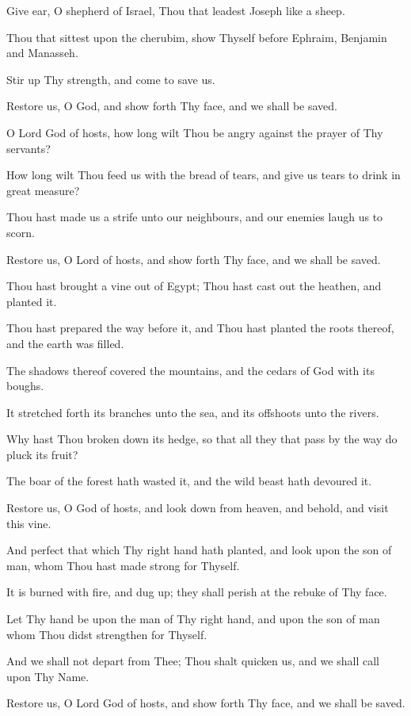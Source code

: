 Give ear, O shepherd of Israel, Thou that leadest Joseph like a sheep.

Thou that sittest upon the cherubim, show Thyself before Ephraim, Benjamin and Manasseh.

Stir up Thy strength, and come to save us.

Restore us, O God, and show forth Thy face, and we shall be saved.

O Lord God of hosts, how long wilt Thou be angry against the prayer of Thy servants?

How long wilt Thou feed us with the bread of tears, and give us tears to drink in great measure?

Thou hast made us a strife unto our neighbours, and our enemies laugh us to scorn.

Restore us, O Lord of hosts, and show forth Thy face, and we shall be saved.

Thou hast brought a vine out of Egypt; Thou hast cast out the heathen, and planted it.

Thou hast prepared the way before it, and Thou hast planted the roots thereof, and the earth was filled.

The shadows thereof covered the mountains, and the cedars of God with its boughs.

It stretched forth its branches unto the sea, and its offshoots unto the rivers.

Why hast Thou broken down its hedge, so that all they that pass by the way do pluck its fruit?

The boar of the forest hath wasted it, and the wild beast hath devoured it.

Restore us, O God of hosts, and look down from heaven, and behold, and visit this vine.

And perfect that which Thy right hand hath planted, and look upon the son of man, whom Thou hast made strong for Thyself.

It is burned with fire, and dug up; they shall perish at the rebuke of Thy face.

Let Thy hand be upon the man of Thy right hand, and upon the son of man whom Thou didst strengthen for Thyself.

And we shall not depart from Thee; Thou shalt quicken us, and we shall call upon Thy Name.

Restore us, O Lord God of hosts, and show forth Thy face, and we shall be saved.
